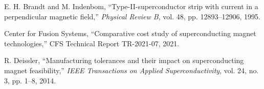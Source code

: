 \documentclass[10pt,twocolumn]{article}
\begin{document}
\begin{thebibliography}{8}
E. H. Brandt and M. Indenbom, ``Type-II-superconductor strip with current in a perpendicular magnetic field,'' \textit{Physical Review B}, vol. 48, pp. 12893--12906, 1995.

Center for Fusion Systems, ``Comparative cost study of superconducting magnet technologies,'' CFS Technical Report TR-2021-07, 2021.

R. Deissler, ``Manufacturing tolerances and their impact on superconducting magnet feasibility,'' \textit{IEEE Transactions on Applied Superconductivity}, vol. 24, no. 3, pp. 1--8, 2014.

\end{thebibliography}
\end{document}
